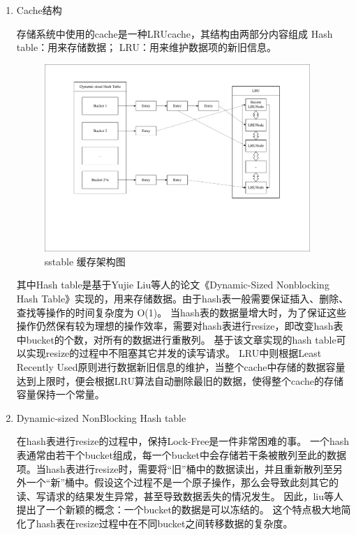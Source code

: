 		\begin{enumerate}
			\item Cache结构 
			
			存储系统中使用的cache是一种LRUcache，其结构由两部分内容组成
			Hash table：用来存储数据；
			LRU：用来维护数据项的新旧信息。

			\begin{figure}[H]
				\centering
				\includegraphics[width=0.95\textwidth]{pdf/cache_arch.pdf}
				\caption{sstable 缓存架构图}
				\label{sstable_cache_arch}
			\end{figure}

			其中Hash table是基于Yujie Liu等人的论文《Dynamic-Sized Nonblocking Hash Table》实现的，用来存储数据。由于hash表一般需要保证插入、删除、查找等操作的时间复杂度为 O(1)。
当hash表的数据量增大时，为了保证这些操作仍然保有较为理想的操作效率，需要对hash表进行resize，即改变hash表中bucket的个数，对所有的数据进行重散列。
基于该文章实现的hash table可以实现resize的过程中不阻塞其它并发的读写请求。
LRU中则根据Least Recently Used原则进行数据新旧信息的维护，当整个cache中存储的数据容量达到上限时，便会根据LRU算法自动删除最旧的数据，使得整个cache的存储容量保持一个常量。


			\item Dynamic-sized NonBlocking Hash table
			
			在hash表进行resize的过程中，保持Lock-Free是一件非常困难的事。
一个hash表通常由若干个bucket组成，每一个bucket中会存储若干条被散列至此的数据项。当hash表进行resize时，需要将“旧”桶中的数据读出，并且重新散列至另外一个“新”桶中。假设这个过程不是一个原子操作，那么会导致此刻其它的读、写请求的结果发生异常，甚至导致数据丢失的情况发生。
因此，liu等人提出了一个新颖的概念：一个bucket的数据是可以冻结的。
这个特点极大地简化了hash表在resize过程中在不同bucket之间转移数据的复杂度。


\end{enumerate}
